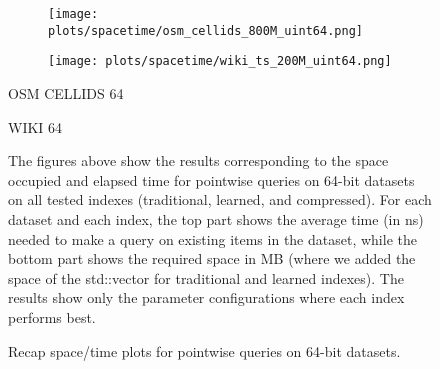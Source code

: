 \documentclass{article}
\begin{document}
\begin{figure}[!htbp]
{\begin{minipage}[t][0.98\textheight][t]{\textwidth}
    \begin{minipage}{0.48\linewidth}
        \begin{figure}[H]
        \texttt{[image: plots/spacetime/osm\_cellids\_800M\_uint64.png]}
        \end{figure}
    \end{minipage}
    \begin{minipage}{0.48\linewidth}
        \begin{figure}[H]
        \texttt{[image: plots/spacetime/wiki\_ts\_200M\_uint64.png]}
        \end{figure}
    \end{minipage}
    \begin{minipage}{0.48\linewidth}
    \begin{center}
        OSM CELLIDS 64
    \end{center}
    \end{minipage}
    \begin{minipage}{0.48\linewidth}
    \begin{center}
        WIKI 64
    \end{center}
    \end{minipage}

    \vfill
    
    \begin{minipage}{\linewidth}
        The figures above show the results corresponding to the space occupied and elapsed time for pointwise queries on 64-bit datasets on all tested indexes (traditional, learned, and compressed). For each dataset and each index, the top part shows the average time (in ns) needed to make a query on existing items in the dataset, while the bottom part shows the required space in MB (where we added the space of the std::vector for traditional and learned indexes).  
    The results show only the parameter configurations where each index performs best. 
    \end{minipage}
    \vspace{10px}
\end{minipage}
}
\caption{Recap space/time plots for pointwise queries on 64-bit datasets.}
\end{figure}
\end{document}
